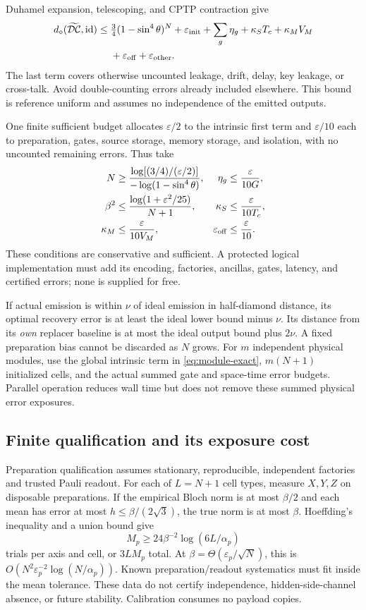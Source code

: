 \documentclass[11pt]{article}
\numberwithin{equation}{section}
\theoremstyle{remark}
\newcommand{\id}{\operatorname{id}}
\newcommand{\Ccal}{\mathcal C}
\newcommand{\Dcal}{\mathcal D}
\newcommand{\eps}{\varepsilon}
\begin{document}
Duhamel expansion, telescoping, and CPTP contraction give
\begin{align}
 d_\diamond(\widetilde{\Dcal\Ccal},\id)
 \le{}&\tfrac34(1-\sin^4\theta)^N+\eps_{\rm init}
       +\sum_g\eta_g+\kappa_ST_c+\kappa_MV_M \notag\\
     &+\eps_{\rm off}+\eps_{\rm other}.              \label{eq:physical-error}
\end{align}
The last term covers otherwise uncounted leakage, drift, delay, key leakage,
or cross-talk. Avoid double-counting errors already included elsewhere.
This bound is reference uniform and assumes no independence of the emitted
outputs.

One finite sufficient budget allocates \(\eps/2\) to the intrinsic first
term and \(\eps/10\) each to preparation, gates, source storage, memory
storage, and isolation, with no uncounted remaining errors. Thus take
\begin{align}
 N&\ge\frac{\log[(3/4)/(\eps/2)]}{-\log(1-\sin^4\theta)},&
 \eta_g&\le\frac{\eps}{10G},\\
 \beta^2&\le\frac{\log(1+\eps^2/25)}{N+1},&
 \kappa_S&\le\frac{\eps}{10T_c},\\
 \kappa_M&\le\frac{\eps}{10V_M},&
 \eps_{\rm off}&\le\frac{\eps}{10}.                  \label{eq:budget}
\end{align}
These conditions are conservative and sufficient. A protected logical
implementation must add its encoding, factories, ancillas, gates, latency,
and certified errors; none is supplied for free.

If actual emission is within \(\nu\) of ideal emission in half-diamond
distance, its optimal recovery error is at least the ideal lower bound
minus \(\nu\). Its distance from its \emph{own} replacer baseline is at most
the ideal output bound plus \(2\nu\). A fixed preparation bias cannot be
discarded as \(N\) grows.
For \(m\) independent physical modules, use the global intrinsic term in
\eqref{eq:module-exact}, \(m(N+1)\) initialized cells, and the actual summed
gate and space-time error budgets. Parallel operation reduces wall time
but does not remove these summed physical error exposures.
\subsection{Finite qualification and its exposure cost}
Preparation qualification assumes stationary, reproducible, independent
factories and trusted Pauli readout. For each of \(L=N+1\) cell types,
measure \(X,Y,Z\) on disposable preparations. If the empirical Bloch norm
is at most \(\beta/2\) and each mean has error at most
\(h\le\beta/(2\sqrt3)\), the true norm is at most \(\beta\).
Hoeffding's inequality and a union bound give
\begin{equation}
 M_p\ge24\beta^{-2}\log(6L/\alpha_p)
 \label{eq:prep-shots}
\end{equation}
trials per axis and cell, or \(3LM_p\) total. At
\(\beta=\Theta(\eps_p/\sqrt N)\), this is
\(O(N^2\eps_p^{-2}\log(N/\alpha_p))\).
Known preparation/readout systematics must fit inside the mean tolerance.
These data do not certify independence, hidden-side-channel absence, or
future stability. Calibration consumes no payload copies.
\end{document}
